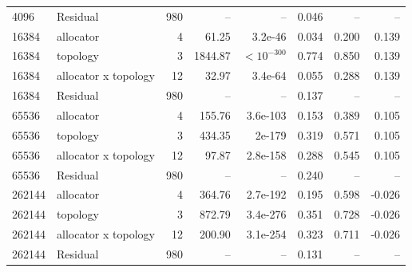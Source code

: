\begin{table}[!htbp]
\begin{tabular}{llrrrrrr}
4096 & Residual & 980 & -- & -- & 0.046 & -- & -- \\
16384 & allocator & 4 & 61.25 & 3.2e-46 & 0.034 & 0.200 & 0.139 \\
16384 & topology & 3 & 1844.87 & $<10^{-300}$ & 0.774 & 0.850 & 0.139 \\
16384 & allocator x topology & 12 & 32.97 & 3.4e-64 & 0.055 & 0.288 & 0.139 \\
16384 & Residual & 980 & -- & -- & 0.137 & -- & -- \\
65536 & allocator & 4 & 155.76 & 3.6e-103 & 0.153 & 0.389 & 0.105 \\
65536 & topology & 3 & 434.35 & 2e-179 & 0.319 & 0.571 & 0.105 \\
65536 & allocator x topology & 12 & 97.87 & 2.8e-158 & 0.288 & 0.545 & 0.105 \\
65536 & Residual & 980 & -- & -- & 0.240 & -- & -- \\
262144 & allocator & 4 & 364.76 & 2.7e-192 & 0.195 & 0.598 & -0.026 \\
262144 & topology & 3 & 872.79 & 3.4e-276 & 0.351 & 0.728 & -0.026 \\
262144 & allocator x topology & 12 & 200.90 & 3.1e-254 & 0.323 & 0.711 & -0.026 \\
262144 & Residual & 980 & -- & -- & 0.131 & -- & -- \\
\bottomrule
\end{tabular}
\end{table}
